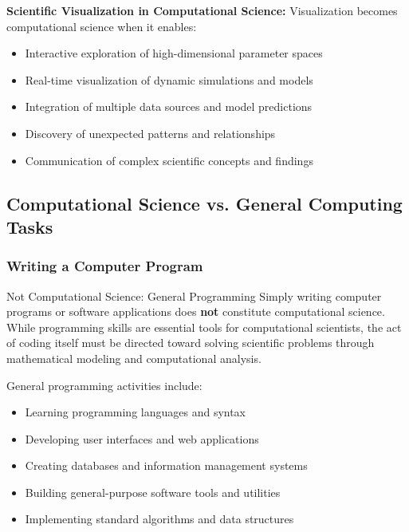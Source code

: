 \textbf{Scientific Visualization in Computational Science:}
Visualization becomes computational science when it enables:
\begin{itemize}
    \item Interactive exploration of high-dimensional parameter spaces
    \item Real-time visualization of dynamic simulations and models
    \item Integration of multiple data sources and model predictions
    \item Discovery of unexpected patterns and relationships
    \item Communication of complex scientific concepts and findings
\end{itemize}

\subsection{Computational Science vs. General Computing Tasks}

\subsubsection{Writing a Computer Program}

\begin{conceptcard}{Not Computational Science: General Programming}
Simply writing computer programs or software applications does \textbf{not} constitute computational science. While programming skills are essential tools for computational scientists, the act of coding itself must be directed toward solving scientific problems through mathematical modeling and computational analysis.
\end{conceptcard}

General programming activities include:
\begin{itemize}
    \item Learning programming languages and syntax
    \item Developing user interfaces and web applications
    \item Creating databases and information management systems
    \item Building general-purpose software tools and utilities
    \item Implementing standard algorithms and data structures
\end{itemize}

